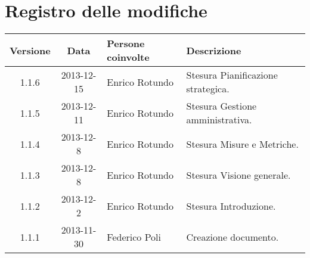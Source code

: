 \section*{Registro delle modifiche}

\small{
\begin{tabularx}{\textwidth}{|c|c|l|X|}
 \hline \textbf{Versione} & \textbf{Data} & \textbf{Persone coinvolte} & \textbf{Descrizione} \\
 \hline 1.1.6 & 2013-12-15 & Enrico Rotundo & Stesura Pianificazione strategica. \\
 \hline 1.1.5 & 2013-12-11 & Enrico Rotundo & Stesura Gestione amministrativa. \\
 \hline 1.1.4 & 2013-12-8 & Enrico Rotundo & Stesura Misure e Metriche. \\
 \hline 1.1.3 & 2013-12-8 & Enrico Rotundo & Stesura Visione generale. \\
 \hline 1.1.2 & 2013-12-2 & Enrico Rotundo & Stesura Introduzione. \\
 \hline 1.1.1 & 2013-11-30 & Federico Poli & Creazione documento. \\
 \hline
\end{tabularx}
}
